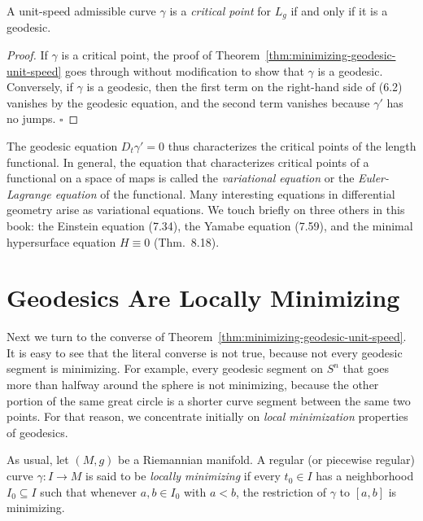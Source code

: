 \begin{corollary}
\label{cor:critical-point-geodesic}

A unit-speed admissible curve $\gamma$ is a \emph{critical point} for $L_g$ if and only if it is a geodesic.
\end{corollary}

\begin{proof}
If $\gamma$ is a critical point, the proof of Theorem~\ref{thm:minimizing-geodesic-unit-speed} goes through without modification to show that $\gamma$ is a geodesic. Conversely, if $\gamma$ is a geodesic, then the first term on the right-hand side of (6.2) vanishes by the geodesic equation, and the second term vanishes because $\gamma'$ has no jumps. $\square$
\end{proof}

The geodesic equation $D_t \gamma' = 0$ thus characterizes the critical points of the length functional. In general, the equation that characterizes critical points of a functional on a space of maps is called the \emph{variational equation} or the \emph{Euler-Lagrange equation} of the functional. Many interesting equations in differential geometry arise as variational equations. We touch briefly on three others in this book: the Einstein equation (7.34), the Yamabe equation (7.59), and the minimal hypersurface equation $H \equiv 0$ (Thm.~8.18).

\section{Geodesics Are Locally Minimizing}

Next we turn to the converse of Theorem~\ref{thm:minimizing-geodesic-unit-speed}. It is easy to see that the literal converse is not true, because not every geodesic segment is minimizing. For example, every geodesic segment on $S^n$ that goes more than halfway around the sphere is not minimizing, because the other portion of the same great circle is a shorter curve segment between the same two points. For that reason, we concentrate initially on \emph{local minimization} properties of geodesics.

As usual, let $(M, g)$ be a Riemannian manifold. A regular (or piecewise regular) curve $\gamma : I \to M$ is said to be \emph{locally minimizing} if every $t_0 \in I$ has a neighborhood $I_0 \subseteq I$ such that whenever $a, b \in I_0$ with $a < b$, the restriction of $\gamma$ to $[a,b]$ is minimizing.

